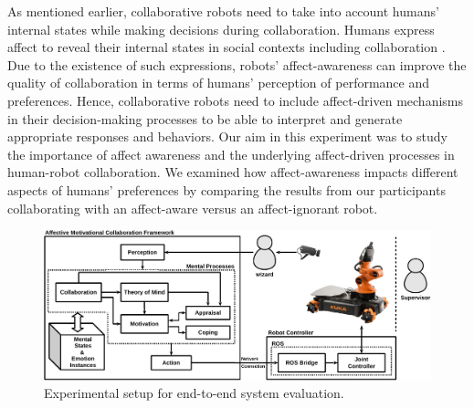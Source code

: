 \documentclass[12pt]{report}
\begin{document}
As mentioned earlier, collaborative robots need to take into account humans'
internal states while making decisions during collaboration. Humans express
affect to reveal their internal states in social contexts including
collaboration \cite{breazeal:sociable-interactive-robots}. Due to the existence
of such expressions, robots' affect-awareness can improve the quality of
collaboration in terms of humans' perception of performance and preferences.
Hence, collaborative robots need to include affect-driven mechanisms in their
decision-making processes to be able to interpret and generate appropriate
responses and behaviors. Our aim in this experiment was to study the importance
of affect awareness and the underlying affect-driven processes in human-robot
collaboration. We examined how affect-awareness impacts different aspects of
humans' preferences by comparing the results from our participants collaborating
with an affect-aware versus an affect-ignorant robot.

\begin{figure}[t]
  \centering
  \includegraphics[width=\textwidth]{figure/framework-croped.pdf}
  \caption{Experimental setup for end-to-end system evaluation.}
  \label{fig:framework}
\end{figure}
\end{document}
